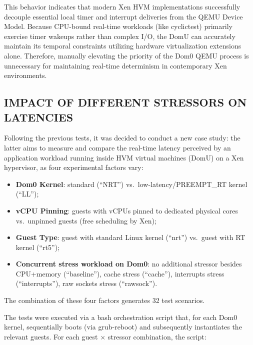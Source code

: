 This behavior indicates that modern Xen HVM implementations successfully
decouple essential local timer and interrupt deliveries from the QEMU
Device Model. Because CPU-bound real-time workloads (like cyclictest)
primarily exercise timer wakeups rather than complex I/O, the DomU can
accurately maintain its temporal constraints utilizing hardware
virtualization extensions alone. Therefore, manually elevating the
priority of the Dom0 QEMU process is unnecessary for maintaining
real-time determinism in contemporary Xen environments.

\subsection{IMPACT OF DIFFERENT STRESSORS ON
LATENCIES}\label{impact-of-different-stressors-on-latencies}

Following the previous tests, it was decided to conduct a new case
study: the latter aims to measure and compare the real-time latency
perceived by an application workload running inside HVM virtual machines
(DomU) on a Xen hypervisor, as four experimental factors vary:

\begin{itemize}
\item
  \textbf{Dom0 Kernel}: standard (``NRT'') vs.~low-latency/PREEMPT\_RT
  kernel (``LL'');
\item
  \textbf{vCPU Pinning}: guests with vCPUs pinned to dedicated physical
  cores vs.~unpinned guests (free scheduling by Xen);
\item
  \textbf{Guest Type}: guest with standard Linux kernel (``nrt'')
  vs.~guest with RT kernel (``rt5'');
\item
  \textbf{Concurrent stress workload on Dom0}: no additional stressor
  besides CPU+memory (``baseline''), cache stress (``cache''),
  interrupts stress (``interrupts''), raw sockets stress (``rawsock'').
\end{itemize}

The combination of these four factors generates 32 test scenarios.

The tests were executed via a bash orchestration script that, for each
Dom0 kernel, sequentially boots (via grub-reboot) and subsequently
instantiates the relevant guests. For each guest × stressor combination,
the script:

